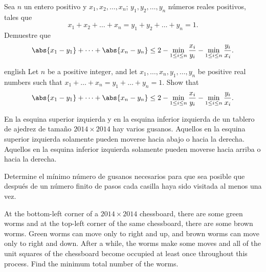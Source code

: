 
\begin{problem}
  Sea $n$ un entero positivo y $x_1,x_2,\dots,x_n$; $y_1,y_2,\dots,y_n$ números
  reales positivos, tales que
  \[x_1+x_2+\dots+x_n=y_1+y_2+\dots+y_n=1.\]
  Demuestre que
  \[
    \abs{x_1-y_1}+\dots+\abs{x_n-y_n}
    \le 2-\min_{1\le i\le n}{\frac{x_i}{y_i}}-\min_{1\le i\le n}{\frac{y_i}{x_i}}.
  \]
  \begin{hint}
    \begin{otherlanguage*}{english}
      Let $n$ be a positive integer, and let $x_1,\dots,x_n,y_1,\dots,y_n$ be
      positive real numbers such that $x_1+\dots+x_n=y_1+\dots+y_n=1$. Show that
      \[
        \abs{x_1-y_1}+\dots+\abs{x_n-y_n}
        \le 2-\min_{1\le i\le n}{\frac{x_i}{y_i}}-\min_{1\le i\le n}{\frac{y_i}{x_i}}.
      \]
    \end{otherlanguage*}
  \end{hint}
\end{problem}

\begin{problem}
  En la esquina superior izquierda y en la esquina inferior izquierda de un
  tablero de ajedrez de tamaño $2014\times 2014$ hay varios gusanos. Aquellos en
  la esquina superior izquierda solamente pueden moverse hacia abajo o hacia la
  derecha. Aquellos en la esquina inferior izquierda solamente pueden moverse
  hacia arriba o hacia la derecha.

  Determine el mínimo número de gusanos necesarios para que sea posible que
  después de un número finito de pasos cada casilla haya sido visitada al menos
  una vez.
  \begin{hint}
    At the bottom-left corner of a $2014\times 2014$ chessboard, there are some
    green worms and at the top-left corner of the same chessboard, there are
    some brown worms. Green worms can move only to right and up, and brown worms
    can move only to right and down. After a while, the worms make some moves
    and all of the unit squares of the chessboard become occupied at least once
    throughout this process. Find the minimum total number of the worms.
  \end{hint}
\end{problem}

